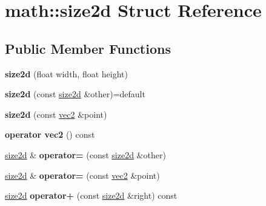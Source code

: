 \hypertarget{structmath_1_1size2d}{}\section{math\+:\+:size2d Struct Reference}
\label{structmath_1_1size2d}
\subsection*{Public Member Functions}
\begin{DoxyCompactItemize}
\item 
\mbox{\label{structmath_1_1size2d_acb7fbddb753387e117cae5daffc5059f}} 
{\bfseries size2d} (float width, float height)
\item 
\mbox{\label{structmath_1_1size2d_aa7c5c30aff365719608223dbddf522af}} 
{\bfseries size2d} (const \hyperlink{structmath_1_1size2d}{size2d} \&other)=default
\item 
\mbox{\label{structmath_1_1size2d_a1034064f1d022597ca4bce6c63818391}} 
{\bfseries size2d} (const \hyperlink{structmath_1_1vec2}{vec2} \&point)
\item 
\mbox{\label{structmath_1_1size2d_ae8d0fe581967431e71cf9ea2c57fbb3f}} 
{\bfseries operator vec2} () const
\item 
\mbox{\label{structmath_1_1size2d_af348be7d277b5280273c0a73a964e6e2}} 
\hyperlink{structmath_1_1size2d}{size2d} \& {\bfseries operator=} (const \hyperlink{structmath_1_1size2d}{size2d} \&other)
\item 
\mbox{\label{structmath_1_1size2d_a71198379024693e9064381be6791102c}} 
\hyperlink{structmath_1_1size2d}{size2d} \& {\bfseries operator=} (const \hyperlink{structmath_1_1vec2}{vec2} \&point)
\item 
\mbox{\label{structmath_1_1size2d_a08f9a5ae799d5c3bb2be5851704079e3}} 
\hyperlink{structmath_1_1size2d}{size2d} {\bfseries operator+} (const \hyperlink{structmath_1_1size2d}{size2d} \&right) const
\item 
\mbox{\label{structmath_1_1size2d_aacb7e43c291c4c828b3d48dd27f28b70}} 

\end{DoxyCompactItemize}
